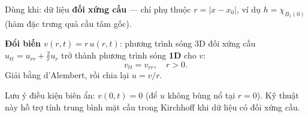 \begin{dieukienbox}
Dùng khi: dữ liệu \textbf{đối xứng cầu} --- chỉ phụ thuộc $r=|x-x_0|$,
ví dụ $h=\chi_{B_1(0)}$ (hàm đặc trưng quả cầu tâm gốc).
\end{dieukienbox}

\begin{nhobox}
\textbf{Đổi biến $v(r,t) = r\,u(r,t)$}:
phương trình sóng 3D đối xứng cầu $u_{tt}=u_{rr}+\frac{2}{r}u_r$
trở thành phương trình sóng \textbf{1D} cho $v$:
\[
  v_{tt} = v_{rr}, \quad r>0.
\]
Giải bằng d'Alembert, rồi chia lại $u = v/r$.
\end{nhobox}

\begin{meobox}
Lưu ý điều kiện biên ẩn: $v(0,t)=0$ (để $u$ không bùng nổ tại $r=0$).
Kỹ thuật này hỗ trợ tính trung bình mặt cầu trong Kirchhoff khi dữ liệu có đối xứng cầu.
\end{meobox}
